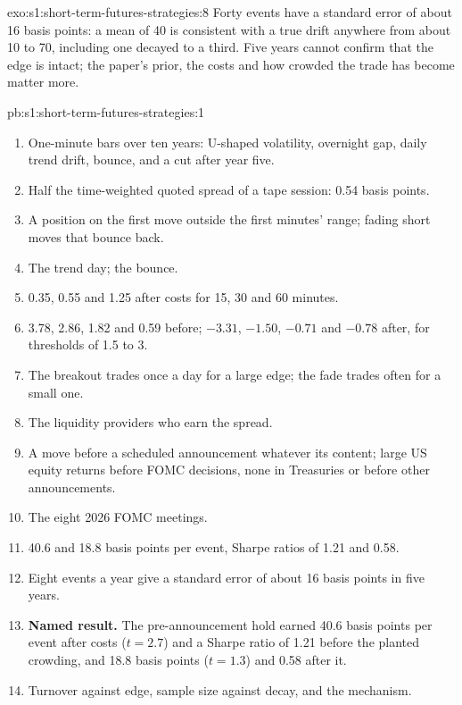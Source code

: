 \begin{solution}{exo:s1:short-term-futures-strategies:8}
Forty events have a standard error of about 16 basis points: a mean of 40 is consistent with a true drift anywhere from about 10 to 70, including one
decayed to a third. Five years cannot confirm that the edge is intact; the paper's prior, the costs and how crowded the trade has become matter more.
\end{solution}

\begin{solution}{pb:s1:short-term-futures-strategies:1}
\begin{enumerate}
\item One-minute bars over ten years: U-shaped volatility, overnight gap, daily trend drift, bounce, and a  cut after year five.
\item Half the time-weighted quoted spread of a tape session: 0.54 basis points.
\item A position on the first move outside the first minutes' range; fading short moves that bounce back.
\item The trend day; the bounce.
\item 0.35, 0.55 and 1.25 after costs for 15, 30 and 60 minutes.
\item 3.78, 2.86, 1.82 and 0.59 before; $-3.31$, $-1.50$, $-0.71$ and $-0.78$ after, for thresholds of 1.5 to 3.
\item The breakout trades once a day for a large edge; the fade trades often for a small one.
\item The liquidity providers who earn the spread.
\item A move before a scheduled announcement whatever its content; large US equity returns before FOMC decisions, none in Treasuries or before other
announcements.
\item The eight 2026 FOMC meetings.
\item 40.6 and 18.8 basis points per event, Sharpe ratios of 1.21 and 0.58.
\item Eight events a year give a standard error of about 16 basis points in five years.
\item \textbf{Named result.} The pre-announcement hold earned 40.6 basis points per event after costs ($t = 2.7$) and a Sharpe ratio of 1.21 before the
planted crowding, and 18.8 basis points ($t = 1.3$) and 0.58 after it.
\item Turnover against edge, sample size against decay, and the mechanism.

\end{enumerate}
\end{solution}
